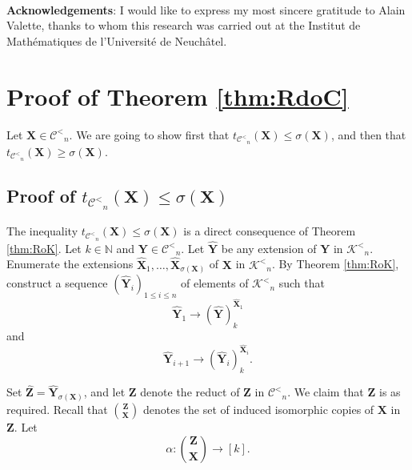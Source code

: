 \documentclass[reqno]{amsart}
\begin{document}
\

\textbf{Acknowledgements}: I would like to express my most sincere gratitude to Alain Valette, thanks to whom this research was carried out at the Institut de Math\'ematiques de l'Universit\'e de Neuch\^atel. 

\section{Proof of Theorem \ref{thm:RdoC}}

\label{section:RdoC}

Let ${\textbf{{X}}} \in {\mathcal{C}^<} _n$. We are going to show first that $t_{{\mathcal{C}^<} _n}({\textbf{{X}}}) \leq \sigma({\textbf{{X}}})$, and then that $t_{{\mathcal{C}^<} _n}({\textbf{{X}}}) \geq \sigma({\textbf{{X}}})$.  

\subsection{Proof of $t_{{\mathcal{C}^<} _n}({\textbf{{X}}}) \leq \sigma({\textbf{{X}}})$}

\label{subsection:t<sigma}

The inequality $t_{{\mathcal{C}^<} _n}({\textbf{{X}}}) \leq \sigma({\textbf{{X}}})$ is a direct consequence of Theorem \ref{thm:RoK}. Let $k \in {\mathbb{N}}$ and ${\textbf{{Y}}} \in {\mathcal{C}^<} _n$. Let ${\widehat{\textbf{{Y}}}}$ be any extension of ${\textbf{{Y}}}$ in ${\mathcal{K}^<} _n$. Enumerate the extensions ${\widehat{\textbf{{X}}}}_1 ,\ldots, {\widehat{\textbf{{X}}}}_{\sigma({\textbf{{X}}})}$ of ${\textbf{{X}}}$ in ${\mathcal{K}^<} _n$. By Theorem \ref{thm:RoK}, construct a sequence $({\widehat{\textbf{{Y}}}}_i)_{1\leq i \leq n}$ of elements of ${\mathcal{K}^<}_n$ such that \[ {\widehat{\textbf{{Y}}}}_1 {\longrightarrow {{({\widehat{\textbf{{Y}}}})}}^{{{\widehat{\textbf{{X}}}}_1 }}_{{k}}} \] and \[ {\widehat{\textbf{{Y}}}}_{i+1} {\longrightarrow {{({\widehat{\textbf{{Y}}}}_i)}}^{{{\widehat{\textbf{{X}}}}_i}}_{{k}}}. \]
 
Set ${\widehat{\textbf{{Z}}}}={\widehat{\textbf{{Y}}}}_{\sigma({\textbf{{X}}})}$, and let ${\textbf{{Z}}}$ denote the reduct of ${\widehat{\textbf{{Z}}}}$ in ${\mathcal{C}^<} _n$. We claim that ${\textbf{{Z}}}$ is as required. Recall that $\binom{{\textbf{{Z}}}}{{\textbf{{X}}}}$ denotes the set of induced isomorphic copies of ${\textbf{{X}}}$ in ${\textbf{{Z}}}$. Let \[ \alpha : {{\binom{{\textbf{{Z}}}}{{\textbf{{X}}}}} \longrightarrow {[k]}}. \]
\end{document}

